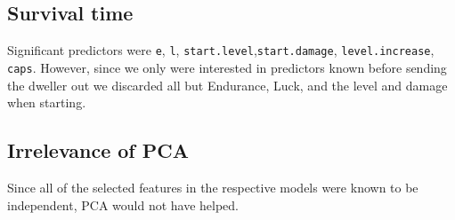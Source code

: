 \subsection{Survival time}
Significant predictors were \texttt{e}, \texttt{l}, \texttt{start.level},\texttt{start.damage}, \texttt{level.increase}, \texttt{caps}. However, since we only were interested in predictors known before sending the dweller out we discarded all but Endurance, Luck, and the level and damage when starting.

\subsection{Irrelevance of PCA}
Since all of the selected features in the respective models were known to be independent, PCA would not have helped.


